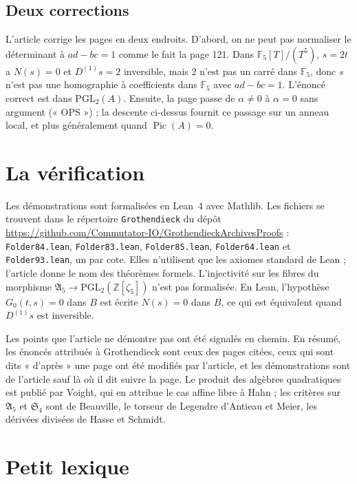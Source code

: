 \documentclass[11pt,a4paper]{amsart}
\theoremstyle{definition}
\theoremstyle{plain}
\theoremstyle{remark}
\theoremstyle{plain}
\newcommand{\Z}{\mathbb Z}
\newcommand{\F}{\mathbb F}
\newcommand{\PGL}{\mathrm{PGL}_2}
\begin{document}
\subsection{Deux corrections}

L'article corrige les pages en deux endroits. D'abord, on ne peut pas normaliser le déterminant à $ad - bc = 1$ comme le fait la page 121. Dans $\F_5[T]/(T^5)$, $s = 2t$ a $N(s) = 0$ et $D^{(1)}s = 2$ inversible, mais $2$ n'est pas un carré dans $\F_5$, donc $s$ n'est pas une homographie à coefficients dans $\F_5$ avec $ad - bc = 1$. L'énoncé correct est dans $\PGL(A)$. Ensuite, la page passe de $\alpha \neq 0$ à $\alpha = 0$ sans argument (« OPS ») ; la descente ci-dessus fournit ce passage sur un anneau local, et plus généralement quand $\operatorname{Pic}(A) = 0$.

\section{La vérification}

Les démonstrations sont formalisées en Lean~4 avec Mathlib. Les fichiers se trouvent dans le répertoire \texttt{Grothendieck} du dépôt \url{https://github.com/Commutator-IO/GrothendieckArchivesProofs} : \texttt{Folder84.lean}, \texttt{Folder83.lean}, \texttt{Folder85.lean}, \texttt{Folder64.lean} et \texttt{Folder93.lean}, un par cote. Elles n'utilisent que les axiomes standard de Lean ; l'article donne le nom des théorèmes formels. L'injectivité sur les fibres du morphisme $\mathfrak A_5 \to \PGL(\Z[\zeta_5])$ n'est pas formalisée. En Lean, l'hypothèse $G_0(t, s) = 0$ dans $B$ est écrite $N(s) = 0$ dans $B$, ce qui est équivalent quand $D^{(1)}s$ est inversible.

Les points que l'article ne démontre pas ont été signalés en chemin. En résumé, les énoncés attribués à Grothendieck sont ceux des pages citées, ceux qui sont dits « d'après » une page ont été modifiés par l'article, et les démonstrations sont de l'article sauf là où il dit suivre la page. Le produit des algèbres quadratiques est publié par Voight, qui en attribue le cas affine libre à Hahn ; les critères sur $\mathfrak A_5$ et $\mathfrak S_4$ sont de Beauville, le torseur de Legendre d'Antieau et Meier, les dérivées divisées de Hasse et Schmidt.

\section{Petit lexique}
\end{document}
